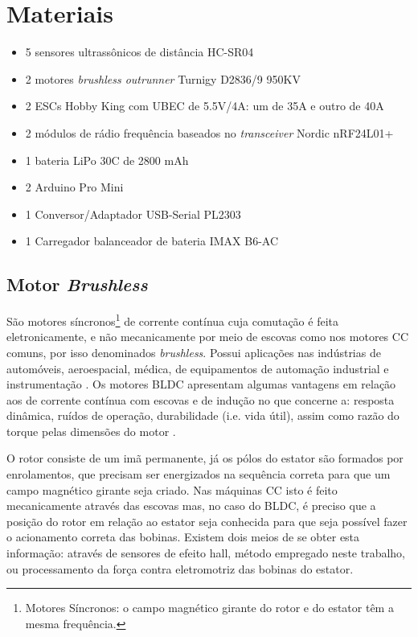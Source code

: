 \chapter{Materiais}
\begin{itemize} %
 \item 5 sensores ultrassônicos de distância HC-SR04
 \item 2 motores \textit{brushless outrunner} Turnigy D2836/9 950KV
 \item 2 ESCs Hobby King com UBEC de 5.5V/4A: um de 35A e outro de 40A 
 \item 2 módulos de rádio frequência baseados no \textit{transceiver} Nordic nRF24L01+ 
 \item 1 bateria LiPo 30C de 2800 mAh
 \item 2 Arduino Pro Mini
 \item 1 Conversor/Adaptador USB-Serial PL2303
 \item 1 Carregador balanceador de bateria IMAX B6-AC
\end{itemize}

\section{Motor \textit{Brushless}}
São motores síncronos\footnote{Motores Síncronos: o campo magnético girante do rotor e do estator têm a mesma frequência.} de corrente contínua cuja 
comutação é feita eletronicamente, e não mecanicamente por meio de escovas como nos motores CC comuns, por isso denominados \textit{brushless}.
Possui aplicações nas indústrias de automóveis, aeroespacial, médica, de equipamentos de automação industrial e instrumentação .
Os motores BLDC apresentam algumas vantagens em relação aos de corrente contínua com escovas e de indução no que concerne a: resposta 
dinâmica, ruídos 
de operação, durabilidade (i.e. vida útil), assim como razão do torque pelas dimensões do motor \cite{motor_2}. 

O rotor consiste de um imã permanente, já os pólos do estator são formados por enrolamentos, que precisam ser energizados na sequência correta 
para que um campo magnético girante seja criado.
Nas máquinas CC isto é feito mecanicamente através das escovas mas, no caso do BLDC, é preciso que a posição do rotor em relação ao estator seja 
conhecida para que seja possível fazer o acionamento correta das bobinas.
Existem dois meios de se obter esta informação: através de sensores de efeito hall, método empregado neste trabalho, ou processamento da força contra 
eletromotriz das bobinas do estator.

